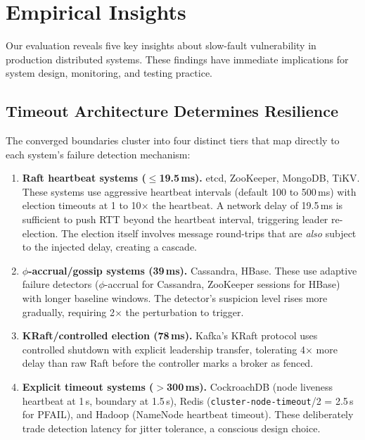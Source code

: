 \section{Empirical Insights}
\label{sec:findings}

Our evaluation reveals five key insights about slow-fault vulnerability in
production distributed systems. These findings have immediate implications
for system design, monitoring, and testing practice.

\subsection{Timeout Architecture Determines Resilience}
\label{sec:finding-timeouts}

The converged boundaries cluster into four distinct tiers that map directly
to each system's failure detection mechanism:

\begin{enumerate}[leftmargin=*,topsep=2pt,itemsep=1pt]
  \item \textbf{Raft heartbeat systems ($\leq$19.5\,ms).} etcd, ZooKeeper,
        MongoDB, TiKV. These systems use aggressive heartbeat
        intervals (default 100 to 500\,ms) with election timeouts at
        1 to 10$\times$ the heartbeat. A network delay of 19.5\,ms is
        sufficient to push RTT beyond the heartbeat interval, triggering
        leader re-election. The election itself involves message
        round-trips that are \emph{also} subject to the injected delay,
        creating a cascade.
  \item \textbf{$\phi$-accrual/gossip systems (39\,ms).} Cassandra, HBase.
        These use adaptive failure detectors ($\phi$-accrual for Cassandra,
        ZooKeeper sessions for HBase) with longer baseline windows. The
        detector's suspicion level rises more gradually, requiring
        2$\times$ the perturbation to trigger.
  \item \textbf{KRaft/controlled election (78\,ms).} Kafka's KRaft protocol
        uses controlled shutdown with explicit leadership transfer,
        tolerating 4$\times$ more delay than raw Raft before the
        controller marks a broker as fenced.
  \item \textbf{Explicit timeout systems ($>$300\,ms).} CockroachDB
        (node liveness heartbeat at 1\,s, boundary at 1.5\,s), Redis
        (\texttt{cluster-node-timeout}/2 = 2.5\,s for PFAIL), and Hadoop
        (NameNode heartbeat timeout). These deliberately trade detection
        latency for jitter tolerance, a conscious design choice.
\end{enumerate}

